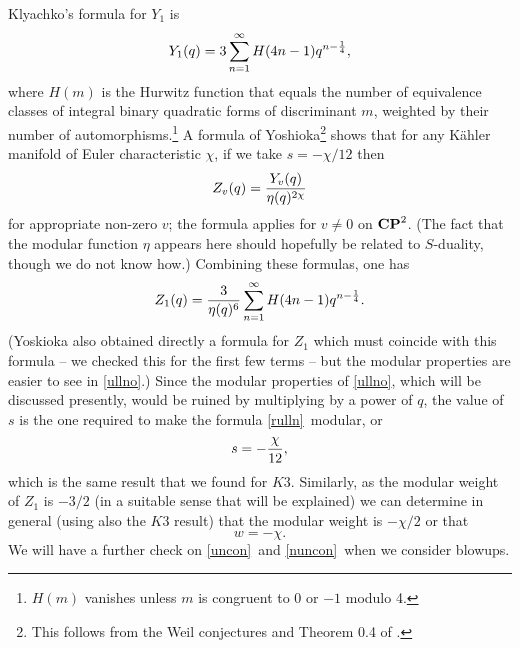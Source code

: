 \documentclass[12pt]{article}
\numberwithin{equation}{section}
\begin{document}
Klyachko's formula for $Y_1$ is
%
\begin{equation}
  \label{nurg}
  Y_1(q)=3\sum_{n=1}^\infty H(4n-1)q^{n-{1\over 4}},
\end{equation}
%
where $H(m)$ is the Hurwitz function that equals the number
of equivalence classes of integral binary quadratic forms of discriminant
$m$, weighted by their number of automorphisms.\footnote{$H(m)$
vanishes unless $m$ is congruent to $0$ or $-1$ modulo 4.}
A formula of Yoshioka\footnote{This follows from the Weil conjectures
and Theorem 0.4 of \cite{yosh}.}
shows that for any K\"ahler manifold
of Euler characteristic $\chi$, if we take $s=-\chi/12$ then
%
\begin{equation}
  \label{rulln}
  Z_v(q) = {Y_v(q)\over\eta(q)^{2\chi}}
\end{equation}
%
for appropriate non-zero $v$; the formula applies for
$v\not= 0$ on ${\bf CP}^2$.  (The fact that the modular function $\eta$
  appears here should hopefully be related to $S$-duality,
though we do not know how.)  Combining these formulas, one has
%
\begin{equation}
  \label{ullno}
  Z_1(q)={3\over \eta(q)^6}\sum_{n=1}^\infty H(4n-1)q^{n-{1\over 4}}.
\end{equation}
%
(Yoskioka also obtained directly \cite{yosh} a formula for $Z_1$
  which must coincide with this formula
  -- we checked this for the first few terms -- but the modular properties
are easier to see in \eqref{ullno}.)   Since the modular properties
of \eqref{ullno}, which will be discussed presently, would be ruined
by multiplying by a power of $q$, the value of $s$ is the one
required to make the formula \eqref{rulln}\ modular, or
\begin{equation}
  \label{uncon}
  s=-{\chi\over 12},
\end{equation}
which is the same result that we found for $K3$.
Similarly, as the modular weight of $Z_1$ is $-3/2$ (in a suitable
sense that will be explained) we can
determine in general (using also the $K3$ result) that the modular
weight is $-\chi/2$ or that
\begin{equation}
  \label{nuncon}
  w=-\chi.
\end{equation}
We will have a further check on \eqref{uncon}\ and
\eqref{nuncon}\ when we consider
blowups.
\end{document}
